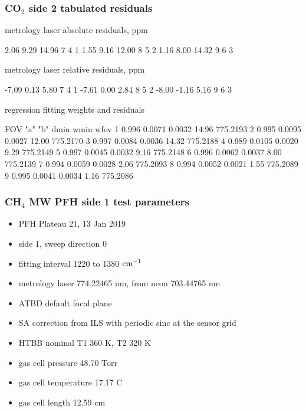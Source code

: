 \documentclass[10pt]{beamer}
\begin{document}
\begin{frame}[fragile]
\frametitle{CO$_2$ side 2 tabulated residuals}

  metrology laser absolute residuals, ppm
\begin{semiverbatim}\scriptsize
      2.06     9.29    14.96         7   4   1
      1.55     9.16    12.00         8   5   2
      1.16     8.00    14.32         9   6   3
\end{semiverbatim}

  metrology laser relative residuals, ppm
\begin{semiverbatim}\scriptsize
     -7.09     0.13     5.80         7   4   1
     -7.61     0.00     2.84         8   5   2
     -8.00    -1.16     5.16         9   6   3
\end{semiverbatim}

     regression fitting weights and residuals
\begin{semiverbatim}\scriptsize
 FOV   "a"       "b"     dmin     wmin      wfov
  1   0.996    0.0071   0.0032    14.96   775.2193 
  2   0.995    0.0095   0.0027    12.00   775.2170 
  3   0.997    0.0084   0.0036    14.32   775.2188 
  4   0.989    0.0105   0.0020     9.29   775.2149 
  5   0.997    0.0045   0.0032     9.16   775.2148 
  6   0.996    0.0062   0.0037     8.00   775.2139 
  7   0.994    0.0059   0.0028     2.06   775.2093 
  8   0.994    0.0052   0.0021     1.55   775.2089 
  9   0.995    0.0041   0.0034     1.16   775.2086 
\end{semiverbatim}

\end{frame}
\begin{frame}
\frametitle{CH$_4$ MW PFH side 1 test parameters}

\begin{itemize}
  \item PFH Plateau 21, 13 Jan 2019
  \item side 1, sweep direction 0
  \item fitting interval 1220 to 1380 $\mbox{cm$^{-1}$}$
  \item metrology laser 774.22465 nm, from neon 703.44765 nm
  \item ATBD default focal plane
  \item SA correction from ILS with periodic sinc at the sensor grid
  \item HTBB nominal T1 360 K, T2 320 K
  \item gas cell pressure 48.70 Torr
  \item gas cell temperature 17.17 C
  \item gas cell length 12.59 cm
\end{itemize}

\end{frame}
\end{document}
